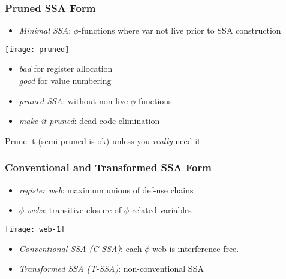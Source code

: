 \begin{frame}
\frametitle{Pruned SSA Form}
\begin{itemize}
\item \emph{Minimal SSA}: $\phi$-functions where var not live prior to SSA construction
\end{itemize}
\texttt{[image: pruned]}
\hspace{-0.8cm}\begin{minipage}[t]{0.47\textwidth}
\begin{itemize}
\item \emph{bad} for register allocation\\ \emph{good} for value numbering
\item \emph{pruned SSA}: without non-live $\phi$-functions
\item \emph{make it pruned}: dead-code elimination
\end{itemize}
\begin{alertblock}{}
Prune it (semi-pruned is ok) unless you \emph{really} need it
\end{alertblock}
\end{minipage}
\end{frame}

\begin{frame}
\frametitle{Conventional and Transformed SSA Form}
\begin{itemize}
\item \emph{register web}: maximum unions of def-use chains
\item \emph{$\phi$-webs}: transitive closure of $\phi$-related variables 
\end{itemize}
\texttt{[image: web-1]}\hfill
{}\hfill
{}
\begin{itemize}
\item<2-> \emph{Conventional SSA (C-SSA)}: each $\phi$-web is interference free. 
\item<3> \emph{Transformed SSA (T-SSA)}: non-conventional SSA
\end{itemize}
\end{frame}


